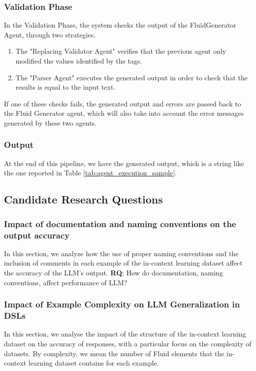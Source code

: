\subsubsection{Validation Phase}
In the Validation Phase, the system checks the output of the FluidGenerator Agent, through two strategies.
\begin{enumerate}
    \item The "Replacing Validator Agent" verifies that the previous agent only modified the values identified by the tags.
    \item The "Parser Agent" executes the generated output in order to check that the results is equal to the input text.
\end{enumerate}

If one of these checks fails, the generated output and errors are passed back to the Fluid Generator agent, which will also take into account the error messages generated by these two agents.

\subsubsection{Output}

At the end of this pipeline, we have the generated output, which is a string like the one reported in Table \ref{tab:agent_execution_sample}.


\subsection{Candidate Research Questions}

\subsubsection{Impact of documentation and naming conventions on the output accuracy}
In this section, we analyze how the use of proper naming conventions and the inclusion of comments in each example of the in-context learning dataset affect the accuracy of the LLM's output.
\textbf{RQ}: How do documentation, naming conventions, affect performance of LLM?

\subsubsection{Impact of Example Complexity on LLM Generalization in DSLs}
In this section, we analyse the impact of the structure of the in-context learning dataset on the accuracy of responses, with a particular focus on the complexity of datasets.
By complexity, we mean the number of Fluid elements that the in-context learning dataset contains for each example.

